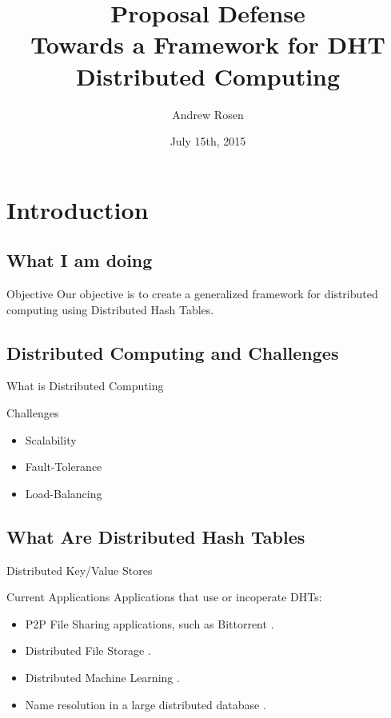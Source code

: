 \documentclass[11pt,aspectratio=169]{beamer}
\author{Andrew Rosen}
\title[DHT Distributed Computing]{Proposal Defense\\ Towards a Framework for DHT Distributed Computing}
\institute{Georgia State University}
\date{July 15th, 2015}
\begin{document}
\maketitle


\section{Introduction}


\subsection{What I am doing}
\begin{frame}{Objective}
Our objective is to create a generalized framework for distributed computing using Distributed Hash Tables.

\end{frame}

\subsection{Distributed Computing and Challenges}

\begin{frame}{What is Distributed Computing}
	
\end{frame}


\begin{frame}{Challenges}
	\begin{itemize}
		\item<1-> Scalability
		\item<2-> Fault-Tolerance
		\item<3-> Load-Balancing
	\end{itemize}
	
\end{frame}


\subsection{What Are Distributed Hash Tables}

\begin{frame}{Distributed Key/Value Stores}
\end{frame}


\begin{frame}{Current Applications}
	Applications that use or incoperate DHTs:
	\begin{itemize}
		\item P2P File Sharing applications, such as Bittorrent \cite{bittorrent} \cite{mainline}.
		\item Distributed File Storage \cite{CFS}.
		\item Distributed Machine Learning \cite{liparameter}.
		\item Name resolution in a large  distributed database \cite{Mateescu2011440}.
	\end{itemize}
\end{frame}
\end{document}
